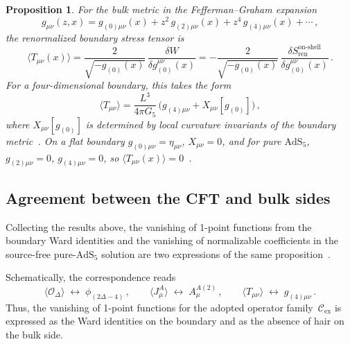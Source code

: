\documentclass[
  aps,
  prd,
  preprint,
  groupedaddress,
  nofootinbib,
  longbibliography
]{revtex4-2}
\newtheorem{proposition}[definition]{Proposition}
\theoremstyle{remark}
\newcommand{\Cex}{\mathcal{C}_{\mathrm{ex}}}
\newcommand{\AdS}{\mathrm{AdS}}
\begin{document}
\begin{proposition}\label{prop:bulk-Tmunu}
For the bulk metric in the Fefferman--Graham expansion
\begin{equation}\label{eq:g-expansion}
  g_{\mu\nu}(z,x) = g_{(0)\mu\nu}(x)
    + z^2\,g_{(2)\mu\nu}(x)
    + z^4\,g_{(4)\mu\nu}(x)
    + \cdots\,,
\end{equation}
the renormalized boundary stress tensor
is~\cite{ref9,ref10,ref11,ref12}
\begin{equation}\label{eq:1pt-Tmunu-bulk}
  \langle T_{\mu\nu}(x)\rangle
  = \frac{2}{\sqrt{-g_{(0)}(x)}}\,
    \frac{\delta W}{\delta g_{(0)}^{\mu\nu}(x)}
  = -\frac{2}{\sqrt{-g_{(0)}(x)}}\,
    \frac{\delta S_{\mathrm{ren}}^{\mathrm{on\text{-}shell}}}
         {\delta g_{(0)}^{\mu\nu}(x)}\,.
\end{equation}
For a four-dimensional boundary, this takes the form
\begin{equation}\label{eq:Tmunu-g4}
  \langle T_{\mu\nu}\rangle
  = \frac{L^3}{4\pi G_5}\,
    \bigl(g_{(4)\mu\nu}
    + X_{\mu\nu}[g_{(0)}]\bigr)\,,
\end{equation}
where $X_{\mu\nu}[g_{(0)}]$ is determined by local curvature
invariants of the boundary metric~\cite{ref9,ref10,ref11,ref12}.
On a flat boundary $g_{(0)\mu\nu}=\eta_{\mu\nu}$,
$X_{\mu\nu}=0$, and for pure $\AdS_5$,
$g_{(2)\mu\nu}=0$, $g_{(4)\mu\nu}=0$, so
$\langle T_{\mu\nu}(x)\rangle = 0$~\cite{ref9,ref10,ref11,ref12}.
\end{proposition}

\subsection{Agreement between the CFT and bulk sides}\label{subsec:2-5}

Collecting the results above, the vanishing of 1-point functions
from the boundary Ward identities and the vanishing of normalizable
coefficients in the source-free pure-$\AdS_5$ solution are two
expressions of the same
proposition~\cite{ref2,ref3,ref9,ref10,ref11,ref12}.

Schematically, the correspondence reads
\begin{equation}\label{eq:dictionary}
  \langle\mathcal{O}_\Delta\rangle
  \;\longleftrightarrow\;
  \phi_{(2\Delta-4)}\,,
  \qquad
  \langle J_\mu^A\rangle
  \;\longleftrightarrow\;
  A_\mu^{A(2)}\,,
  \qquad
  \langle T_{\mu\nu}\rangle
  \;\longleftrightarrow\;
  g_{(4)\mu\nu}\,.
\end{equation}
Thus, the vanishing of 1-point functions for the adopted operator
family~$\Cex$ is expressed as the Ward identities on the boundary
and as the absence of hair on the bulk side.
\end{document}
